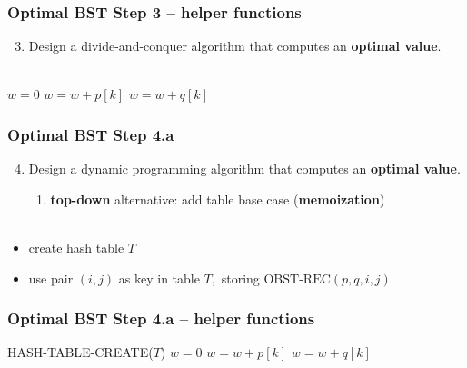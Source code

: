 \documentclass{beamer}
\newcommand{\stanza}{ \\~\ }
\begin{document}
\begin{frame} \frametitle{Optimal BST Step 3 -- helper functions}
  \begin{enumerate}
    \setcounter{enumi}{2}
    \item Design a divide-and-conquer algorithm that computes an \textbf{optimal value}.
    \stanza
  \end{enumerate}

  {\scriptsize
  \begin{algorithmic}[1]
      \State {}
    \EndFunction
      \State $w = 0$
        \State $w = w + p[k]$
      \EndFor
        \State $w = w + q[k]$
      \EndFor
      \State {}
    \EndFunction
  \end{algorithmic}
  }
\end{frame}

\begin{frame} \frametitle{Optimal BST Step 4.a}
  \begin{enumerate}
    \setcounter{enumi}{3}
    \item Design a dynamic programming algorithm that computes an \textbf{optimal value}.
    \begin{enumerate}
      \item \textbf{top-down} alternative: add table base case (\textbf{memoization})
      \stanza
    \end{enumerate}
\end{enumerate}

\begin{itemize}
  \item create hash table $T$
  \item use pair $(i, j)$ as key in table $T,$ storing $\text{OBST-REC}(p, q, i, j)$
\end{itemize}
\end{frame}

\begin{frame} \frametitle{Optimal BST Step 4.a -- helper functions}
  {\scriptsize
  \begin{algorithmic}[1]
      \State HASH-TABLE-CREATE($T$)
      \State {}
    \EndFunction
      \State $w = 0$
        \State $w = w + p[k]$
      \EndFor
        \State $w = w + q[k]$
      \EndFor
      \State {}
    \EndFunction
  \end{algorithmic}
  }
\end{frame}
\end{document}
